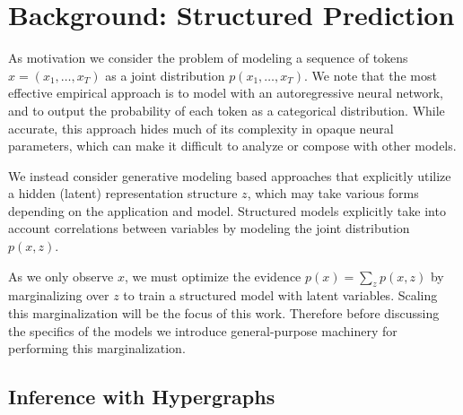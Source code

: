\documentclass{article}
\newcommand\todo[1]{\textcolor{red}{#1}}
\begin{document}
\section{Background: Structured Prediction}







As motivation we consider the problem of modeling a sequence of tokens $x=(x_1, \dots, x_T)$ as a
joint distribution $p(x_1, \ldots, x_T)$. We note that the most effective empirical approach is to model with an autoregressive neural network, and to
output the probability of each token as a categorical distribution. While accurate, this
approach hides much of its complexity in opaque neural parameters,
which can make it difficult to analyze or compose with other models.

We instead consider generative modeling based approaches that explicitly
utilize a hidden (latent) representation structure $z$, which may take various
forms depending on the application and model.  Structured models
explicitly take into account correlations between variables by
modeling the joint distribution $p(x,z)$.

As we only observe $x$, we must optimize the evidence
$p(x) = \sum_z p(x,z)$ by marginalizing over $z$ to train a
structured model with latent variables. Scaling this marginalization
will be the focus of this work. Therefore before discussing the
specifics of the models we introduce general-purpose machinery for
performing this marginalization.


\subsection{Inference with Hypergraphs}
\end{document}
